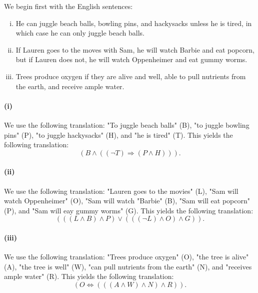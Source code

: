 \documentclass{report}
\begin{document}
  \begin{answer}

    We begin first with the English sentences:
      \begin{enumerate}[(i)]
        \item He can juggle beach balls, bowling pins, and hackysacks unless
          he is tired, in which case he can only juggle beach balls.
        \item
          If Lauren goes to the moves with Sam, he will watch Barbie and
            eat popcorn, but if Lauren does not, he will watch Oppenheimer and
            eat gummy worms.
        \item
          Trees produce oxygen if they are alive and well, able to pull
            nutrients from the earth, and receive ample water.
      \end{enumerate}

    \paragraph{(i)}%

      We use the following translation: "To juggle beach balls" (B),
        "to juggle bowling pins" (P), "to juggle hackysacks" (H), and
        "he is tired" (T).
      This yields the following translation:
        $$(B \land ((\neg T) \Rightarrow (P \land H))).$$

    \paragraph{(ii)}%

      We use the following translation: "Lauren goes to the movies" (L),
        "Sam will watch Oppenheimer" (O), "Sam will watch "Barbie" (B),
        "Sam will eat popcorn" (P), and "Sam will eay gummy worms" (G).
      This yields the following translation:
        $$(((L \land B) \land P) \lor (((\neg L) \land O) \land G)).$$

    \paragraph{(iii)}%

      We use the following translation: "Trees produce oxygen" (O),
        "the tree is alive" (A), "the tree is well" (W), "can pull nutrients
        from the earth" (N), and "receives ample water" (R).
      This yields the following translation:
        $$(O \iff (((A \land W) \land N) \land R)).$$

  \end{answer}
\end{document}
